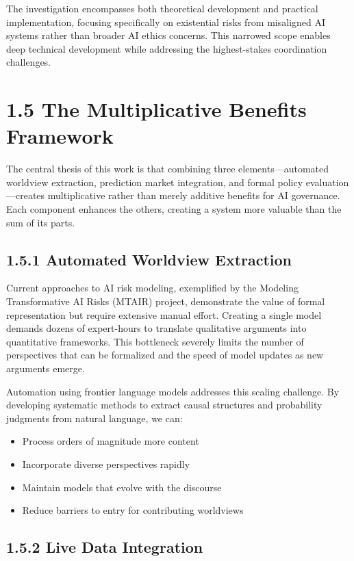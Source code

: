 \documentclass[
  11pt,
  letterpaper,
  openany]{book}
\providecommand{\tightlist}{%
  \setlength{\itemsep}{0pt}\setlength{\parskip}{0pt}}
\begin{document}
The investigation encompasses both theoretical development and practical
implementation, focusing specifically on existential risks from
misaligned AI systems rather than broader AI ethics concerns. This
narrowed scope enables deep technical development while addressing the
highest-stakes coordination challenges.

\section{1.5 The Multiplicative Benefits
Framework}\label{the-multiplicative-benefits-framework}

The central thesis of this work is that combining three
elements---automated worldview extraction, prediction market
integration, and formal policy evaluation---creates multiplicative
rather than merely additive benefits for AI governance. Each component
enhances the others, creating a system more valuable than the sum of its
parts.

\subsection{1.5.1 Automated Worldview
Extraction}\label{automated-worldview-extraction}

Current approaches to AI risk modeling, exemplified by the Modeling
Transformative AI Risks (MTAIR) project, demonstrate the value of formal
representation but require extensive manual effort. Creating a single
model demands dozens of expert-hours to translate qualitative arguments
into quantitative frameworks. This bottleneck severely limits the number
of perspectives that can be formalized and the speed of model updates as
new arguments emerge.

Automation using frontier language models addresses this scaling
challenge. By developing systematic methods to extract causal structures
and probability judgments from natural language, we can:

\begin{itemize}
\tightlist
\item
  Process orders of magnitude more content
\item
  Incorporate diverse perspectives rapidly
\item
  Maintain models that evolve with the discourse
\item
  Reduce barriers to entry for contributing worldviews
\end{itemize}

\subsection{1.5.2 Live Data Integration}\label{live-data-integration}
\end{document}
